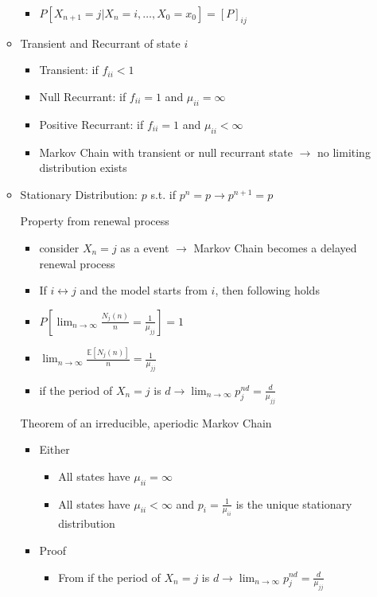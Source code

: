 \documentclass[a4paper]{article}
\begin{document}
\begin{itemize}
\begin{itemize}
                \begin{itemize}
                    \item $P[X_{n+1} = j|X_n = i, \dots, X_0 = x_0] = [P]_{ij}$
                \end{itemize}
            \item Transient and Recurrant of state $i$
                \begin{itemize}
                    \item Transient: if $f_{ii} < 1$
                    \item Null Recurrant: if $f_{ii} = 1$ and $\mu_{ii} = \infty$
                    \item Positive Recurrant: if $f_{ii} = 1$ and $\mu_{ii} < \infty$
                    \item Markov Chain with transient or null recurrant state $\rightarrow$ no limiting distribution exists
                \end{itemize}
            \item Stationary Distribution: $p$ s.t. if $p^n = p \rightarrow p^{n+1} = p$

                Property from renewal process
                \begin{itemize}
                    \item consider $X_n = j$ as a event $\rightarrow$ Markov Chain becomes a delayed renewal process
                    \item If $i \leftrightarrow j$ and the model starts from $i$, then following holds
                    \item $P[\lim_{n \rightarrow \infty} \frac{N_j(n)}{n} = \frac{1}{\mu_{jj}}] = 1$
                    \item $\lim_{n \rightarrow \infty} \frac{\mathbb{E}[N_j(n)]}{n} = \frac{1}{\mu_{jj}}$
                    \item if the period of $X_n = j$ is $d \rightarrow \lim_{n \rightarrow \infty} p_j^{nd} = \frac{d}{\mu_{jj}}$
                \end{itemize}
                Theorem of an irreducible, aperiodic Markov Chain
                \begin{itemize}
                    \item Either
                        \begin{itemize}
                            \item All states have $\mu_{ii} = \infty$
                            \item All states have $\mu_{ii} < \infty$ and $p_i = \frac{1}{\mu_{ii}}$ is the unique stationary distribution
                        \end{itemize}
                    \item Proof
                        \begin{itemize}
                            \item From if the period of $X_n = j$ is $d \rightarrow \lim_{n \rightarrow \infty} p_j^{nd} = \frac{d}{\mu_{jj}}$


\end{itemize}
\end{itemize}
\end{itemize}
\end{itemize}
\end{document}
